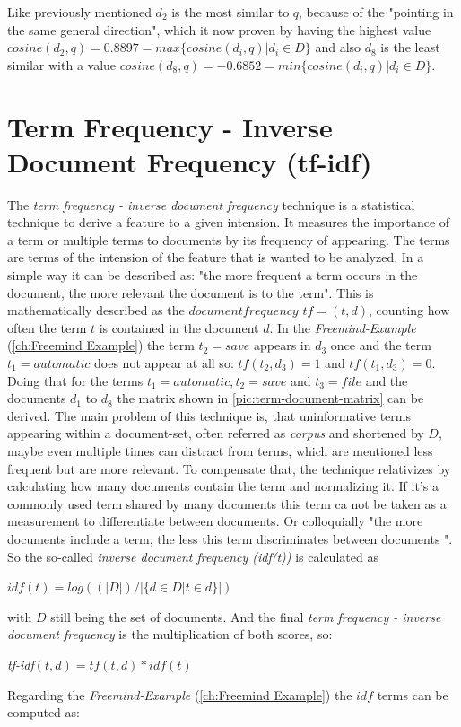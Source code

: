 Like previously mentioned $d_2$ is the most similar to $q$, because of the "pointing in the same general direction", which it now proven by having the highest value $cosine(d_2,q)=0.8897=max \{ cosine(d_i,q) | d_i \in D \} $ and also $d_8$ is the least similar with a value $cosine(d_8,q)=-0.6852=min\{cosine(d_i,q) | d_i \in D\}$.
  
\section{Term Frequency - Inverse Document Frequency (tf-idf)}
\label{sec:tf-idf}
The \emph{term frequency - inverse document frequency} technique is a statistical technique to derive a feature to a given intension. It measures the importance of a term or multiple terms to documents by its frequency of appearing. The terms are terms of the intension of the feature that is wanted to be analyzed. In a simple way it can be described as: "the more frequent a term occurs in the document, the more relevant the document is to the term". \newline
This is mathematically described as the $document frequency$ $tf=(t,d)$, counting how often the term $t$ is contained in the document $d$.
In the \textit{Freemind-Example} (\autoref{ch:Freemind Example}) the term $t_2 = save$ appears in $d_3$ once and the term $t_1 = automatic$ does not appear at all so: $tf(t_2,d_3) = 1$ and $tf(t_1,d_3)=0$. \newline
Doing that for the terms $t_1 = automatic, t_2 = save$ and $t_3 = file$ and the documents $d_1$ to $d_8$ the matrix shown in \autoref{pic:term-document-matrix} can be derived.
The main problem of this technique is, that uninformative terms appearing within a document-set, often referred as \emph{corpus} and shortened by $D$, maybe even multiple times can distract from terms, which are mentioned less frequent but are more relevant. To compensate that, the technique relativizes by calculating how many documents contain the term and normalizing it. If it's a commonly used term shared by many documents this term ca not be taken as a measurement to differentiate between documents. Or colloquially "the more documents include a term, the less this term discriminates between documents ". \newline
So the so-called \emph{inverse document frequency (idf(t))} is calculated as
\begin{center} $idf(t) = log((|D|)/|\{ d \in D | t \in d \}|)$  \end{center}
with $D$ still being the set of documents. And the final \emph{term frequency - inverse document frequency} is the multiplication of both scores, so:
\begin{center} \emph{tf-idf}$(t,d) = tf(t,d) * idf(t)$\end{center}
Regarding the \textit{Freemind-Example} (\autoref{ch:Freemind Example}) the $idf$ terms can be computed as:

